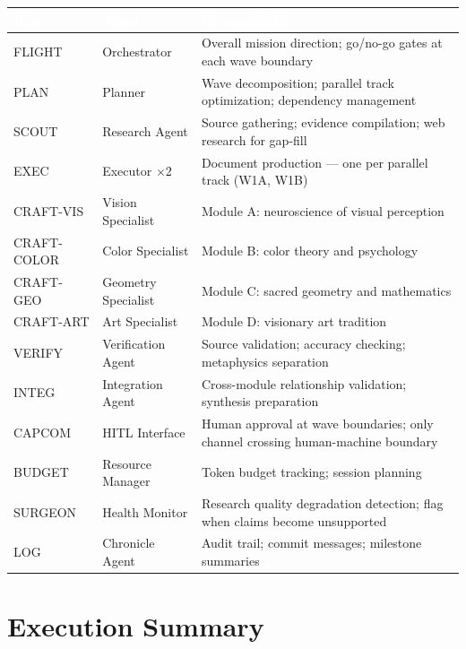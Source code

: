 \documentclass[11pt,letterpaper]{article}
\newcommand{\tableheader}[1]{\textbf{\sffamily\textcolor{white}{#1}}}
\begin{document}
\begin{center}
\begin{tabularx}{\textwidth}{L{1.5cm}L{3cm}X}
\toprule
{}
\tableheader{Role} & \tableheader{Agent} & \tableheader{Responsibility} \\
\midrule
FLIGHT & Orchestrator & Overall mission direction; go/no-go gates at each wave boundary \\
PLAN & Planner & Wave decomposition; parallel track optimization; dependency management \\
SCOUT & Research Agent & Source gathering; evidence compilation; web research for gap-fill \\
EXEC & Executor $\times$2 & Document production --- one per parallel track (W1A, W1B) \\
CRAFT-VIS & Vision Specialist & Module A: neuroscience of visual perception \\
CRAFT-COLOR & Color Specialist & Module B: color theory and psychology \\
CRAFT-GEO & Geometry Specialist & Module C: sacred geometry and mathematics \\
CRAFT-ART & Art Specialist & Module D: visionary art tradition \\
VERIFY & Verification Agent & Source validation; accuracy checking; metaphysics separation \\
INTEG & Integration Agent & Cross-module relationship validation; synthesis preparation \\
CAPCOM & HITL Interface & Human approval at wave boundaries; only channel crossing human-machine boundary \\
BUDGET & Resource Manager & Token budget tracking; session planning \\
SURGEON & Health Monitor & Research quality degradation detection; flag when claims become unsupported \\
LOG & Chronicle Agent & Audit trail; commit messages; milestone summaries \\
\bottomrule
\end{tabularx}
\end{center}

\section{Execution Summary}
\end{document}
